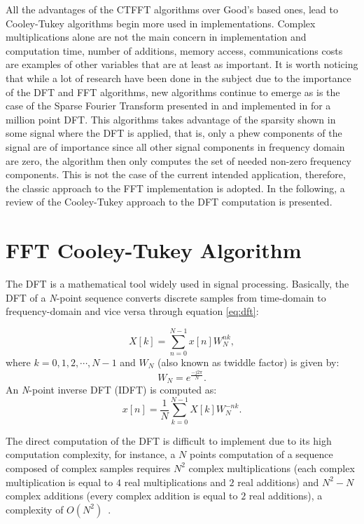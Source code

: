 All the advantages of the CTFFT algorithms over Good's based ones, lead to Cooley-Tukey algorithms begin more used in implementations. Complex multiplications alone are not the main concern in implementation and computation time, number of additions, memory access, communications costs are examples of other variables that are at least as important. It is worth noticing that while a lot of research have been done in the subject due to the importance of the DFT and FFT algorithms, new algorithms continue to emerge as is the case of the Sparse Fourier Transform presented in \cite{sfft_paper} and implemented in \cite{milion_point_sfft} for a million point DFT. This algorithms takes advantage of the sparsity shown in some signal where the DFT is applied, that is, only a phew components of the signal are of importance since all other signal components in frequency domain are zero, the algorithm then only computes the set of needed non-zero frequency components. This is not the case of the current intended application, therefore, the classic approach to the FFT implementation is adopted. In the following, a review of the Cooley-Tukey approach to the DFT computation is presented.




\section{FFT Cooley-Tukey Algorithm}




The DFT is a mathematical tool widely used in signal processing. Basically, the DFT of a \textit{N}-point sequence converts discrete samples from time-domain to frequency-domain and vice versa through equation \ref{eq:dft}: 

 \begin{equation} 
     X[k]=\sum _{n=0}^{N-1} x[n]W^{nk}_N,
     \label{eq:dft}
 \end{equation}
where $k =0,1,2,\cdots,\textit{N}-1$ and $W_N$ (also known as twiddle factor)
is given by:
 \begin{equation} 
     W_N= \textit{e}^{\frac{-j2\pi}{N}}.
     \label{eq:twiddle}
 \end{equation}
An \textit{N}-point inverse DFT (IDFT) is computed as: 
 \begin{equation} 
     x[n]=\frac{1}{N}\sum _{k=0}^{N-1} X[k]W^{-nk}_N.
     \label{eq:idft}
 \end{equation}

The direct computation of the DFT is difficult to implement due to its high computation complexity, for instance, a $N$ points computation of a sequence composed of complex samples requires $N^2$ complex multiplications (each complex multiplication is equal to $4$ real multiplications and $2$ real additions) and $N^2-N$ complex additions (every complex addition is equal to $2$ real additions), a complexity of $O(N^2)$~\cite{proakis1996digital}. 

